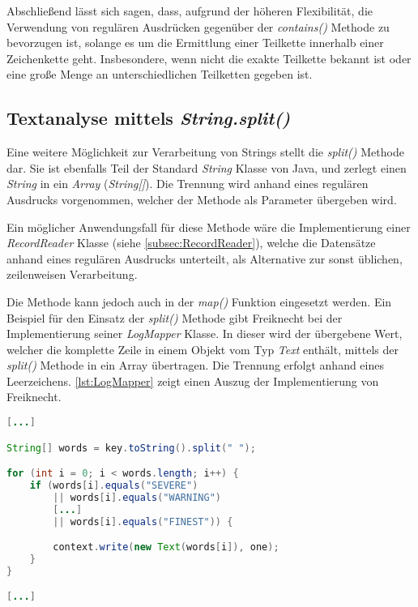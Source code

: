 Abschließend lässt sich sagen, dass, aufgrund der höheren Flexibilität, die Verwendung von regulären Ausdrücken gegenüber der \textit{contains()} Methode zu bevorzugen ist, solange es um die Ermittlung einer Teilkette innerhalb einer Zeichenkette geht. Insbesondere, wenn nicht die exakte Teilkette bekannt ist oder eine große Menge an unterschiedlichen Teilketten gegeben ist.


\subsection{Textanalyse mittels \textit{String.split()}}
Eine weitere Möglichkeit zur Verarbeitung von Strings stellt die \textit{split()} Methode dar. Sie ist ebenfalls Teil der Standard \textit{String} Klasse von Java, und zerlegt einen \textit{String} in ein \textit{Array} (\textit{String[]}). Die Trennung wird anhand eines regulären Ausdrucks vorgenommen, welcher der Methode als Parameter übergeben wird.

Ein möglicher Anwendungsfall für diese Methode wäre die Implementierung einer \textit{RecordReader} Klasse (siehe \autoref{subsec:RecordReader}), welche die Datensätze anhand eines regulären Ausdrucks unterteilt, als Alternative zur sonst üblichen, zeilenweisen Verarbeitung.

Die Methode kann jedoch auch in der \textit{map()} Funktion eingesetzt werden. Ein Beispiel für den Einsatz der \textit{split()} Methode gibt Freiknecht bei der Implementierung seiner \textit{LogMapper} Klasse. In dieser wird der übergebene Wert, welcher die komplette Zeile in einem Objekt vom Typ \textit{Text} enthält, mittels der \textit{split()} Methode in ein Array übertragen. Die Trennung erfolgt anhand eines Leerzeichens. \autoref{lst:LogMapper} zeigt einen Auszug der Implementierung von Freiknecht. \\

\begin{lstlisting}[language=Java,caption=Auszug der \textit{map()} Methode der Klasse \textit{LogMapper}, title=\autoref*{lst:LogMapper}: Auszug der \textit{map()} Methode der Klasse \textit{LogMapper}\protect\footnotemark,label=lst:LogMapper]
[...]

String[] words = key.toString().split(" ");

for (int i = 0; i < words.length; i++) {
	if (words[i].equals("SEVERE")
		|| words[i].equals("WARNING")
		[...]
		|| words[i].equals("FINEST")) {

		context.write(new Text(words[i]), one);
	}
}

[...]
\end{lstlisting}

